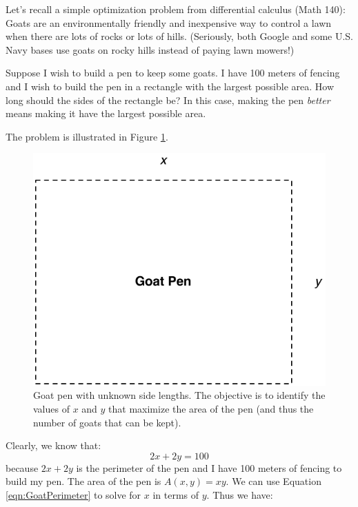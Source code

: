 \begin{example}
Let's recall a simple optimization problem from differential calculus (Math 140): Goats are an environmentally friendly and inexpensive way to control a lawn when there are lots of rocks or lots of hills. (Seriously, both Google and some U.S. Navy bases use goats on rocky hills instead of paying lawn mowers!) 

Suppose I wish to build a pen to keep some goats. I have 100 meters of fencing and I wish to build the pen in a rectangle with the largest possible area. How long should the sides of the rectangle be? In this case, making the pen \textit{better} means making it have the largest possible area.

The problem is illustrated in Figure \ref{fig:GoatPen}.
\begin{figure}[htbp]
\centering
\includegraphics[scale=0.6]{GoatPen.pdf}
\caption{Goat pen with unknown side lengths. The objective is to identify the values of $x$ and $y$ that maximize the area of the pen (and thus the number of goats that can be kept).}
\label{fig:GoatPen}
\end{figure}
Clearly, we know that:
\begin{equation}
2x + 2y = 100
\label{eqn:GoatPerimeter}
\end{equation}
because $2x + 2y$ is the perimeter of the pen and I have 100 meters of fencing to build my pen. The area of the pen is $A(x,y) = xy$. We can use Equation \ref{eqn:GoatPerimeter} to solve for $x$ in terms of $y$. Thus we have:
\begin{equation}

\end{equation}
\end{example}

